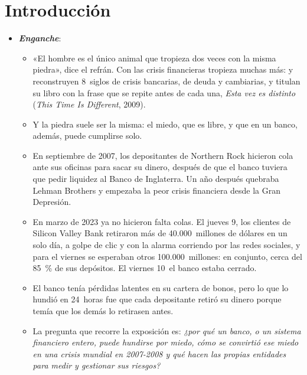 \documentclass[11pt]{article}
\begin{document}
\tceetitulo

\section*{Introducción}

\begin{itemize}
\item \textbf{\emph{Enganche}}:
  \begin{itemize}
  \item «El hombre es el único animal que tropieza dos veces con la misma piedra», dice el refrán. Con las crisis financieras tropieza muchas más:  y  reconstruyen 8~siglos de crisis bancarias, de deuda y cambiarias, y titulan su libro con la frase que se repite antes de cada una, \emph{Esta vez es distinto} (\emph{This Time Is Different}, 2009)\nocite{ReinhartRogoff2009This}.
  \item Y la piedra suele ser la misma: el miedo, que es libre, y que en un banco, además, puede cumplirse solo.
  \item En septiembre de 2007, los depositantes de Northern Rock hicieron cola ante sus oficinas para sacar su dinero, después de que el banco tuviera que pedir liquidez al Banco de Inglaterra\nocite{BoE2007NorthernRock,ShinNorthernRock2009}. Un año después quebraba Lehman Brothers y empezaba la peor crisis financiera desde la Gran Depresión.
  \item En marzo de 2023 ya no hicieron falta colas. El jueves 9, los clientes de Silicon Valley Bank retiraron más de 40.000~millones de dólares en un solo día, a golpe de clic y con la alarma corriendo por las redes sociales, y para el viernes se esperaban otros 100.000~millones: en conjunto, cerca del 85~\% de sus depósitos. El viernes 10~el banco estaba cerrado\nocite{FED2023SVB}.
  \item El banco tenía pérdidas latentes en su cartera de bonos, pero lo que lo hundió en 24~horas fue que cada depositante retiró su dinero porque temía que los demás lo retirasen antes.
  \item La pregunta que recorre la exposición es: \emph{¿por qué un banco, o un sistema financiero entero, puede hundirse por miedo, cómo se convirtió ese miedo en una crisis mundial en 2007-2008 y qué hacen las propias entidades para medir y gestionar sus riesgos?}
  \end{itemize}


\end{itemize}
\end{document}
